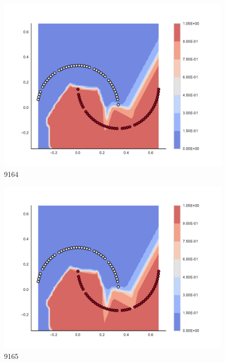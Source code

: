 \begin{subfigure}[b]{0.09\textwidth}
    \includegraphics[clip, trim=2.35cm 1.75cm 4.5cm 0cm,width=\textwidth]{img/convergence/9164.pdf}
    \caption{9164}
    \label{fig:convergence_9164}
\end{subfigure}
%
\begin{subfigure}[b]{0.09\textwidth}
    \includegraphics[clip, trim=2.35cm 1.75cm 4.5cm 0cm,width=\textwidth]{img/convergence/9165.pdf}
    \caption{9165}
    \label{fig:convergence_9165}
\end{subfigure}
%
